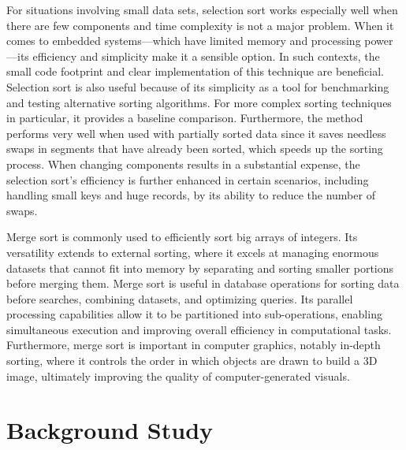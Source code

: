 \documentclass[twocolumn]{article}
\begin{document}
For situations involving small data sets, selection sort works especially well when there are few components and time complexity is not a major problem. When it comes to embedded systems—which have limited memory and processing power—its efficiency and simplicity make it a sensible option. In such contexts, the small code footprint and clear implementation of this technique are beneficial. Selection sort is also useful because of its simplicity as a tool for benchmarking and testing alternative sorting algorithms. For more complex sorting techniques in particular, it provides a baseline comparison. Furthermore, the method performs very well when used with partially sorted data since it saves needless swaps in segments that have already been sorted, which speeds up the sorting process. When changing components results in a substantial expense, the selection sort's efficiency is further enhanced in certain scenarios, including handling small keys and huge records, by its ability to reduce the number of swaps.\cite{scholarhat-selection-sort}

Merge sort is commonly used to efficiently sort big arrays of integers. Its versatility extends to external sorting, where it excels at managing enormous datasets that cannot fit into memory by separating and sorting smaller portions before merging them. Merge sort is useful in database operations for sorting data before searches, combining datasets, and optimizing queries. Its parallel processing capabilities allow it to be partitioned into sub-operations, enabling simultaneous execution and improving overall efficiency in computational tasks. Furthermore, merge sort is important in computer graphics, notably in-depth sorting, where it controls the order in which objects are drawn to build a 3D image, ultimately improving the quality of computer-generated visuals\cite{scholarhat-merge-sort}.


\section*{Background Study}
\end{document}
